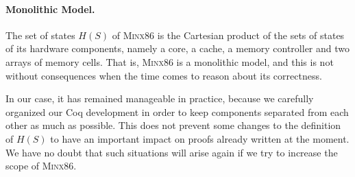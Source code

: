\paragraph{Monolithic Model.}
%
The set of states \( H(S) \) of {\scshape Minx86} is the Cartesian product of
the sets of states of its hardware components, namely a core, a cache, a memory
controller and two arrays of memory cells.
%
That is, {\scshape Minx86} is a monolithic model, and this is not without
consequences when the time comes to reason about its correctness.

In our case, it has remained manageable in practice, because we carefully
organized our Coq development in order to keep components separated from each
other as much as possible.
%
This does not prevent some changes to the definition of \( H(S) \) to have an
important impact on proofs already written at the moment.
%
We have no doubt that such situations will arise again if we try to increase the
scope of {\scshape Minx86}.

